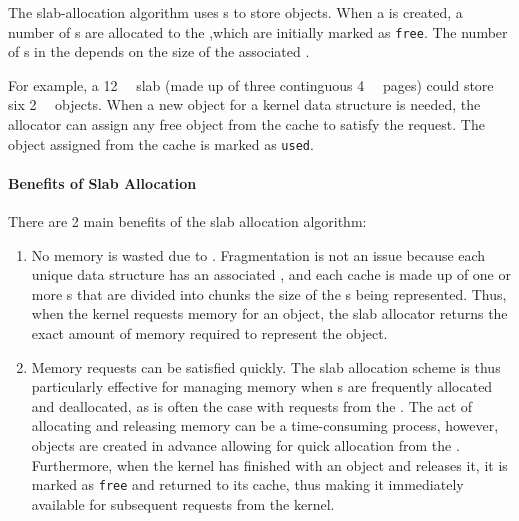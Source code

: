 The slab-allocation algorithm uses s to store  objects.
When a  is created, a number of s are allocated to the ,which are initially marked as \texttt{free}.
The number of s in the  depends on the size of the associated .

For example, a \SI{12}{\kibi{} \byte{}} slab (made up of three continguous \SI{4}{\kibi{} \byte{}} pages) could store six \SI{2}{\kibi{} \byte{}} objects.
When a new object for a kernel data structure is needed, the allocator can assign any free object from the cache to satisfy the request.
The object assigned from the cache is marked as \texttt{used}.

\paragraph{Benefits of Slab Allocation}\label{subsubsec:Slab_Allocation_Benefits}
There are 2 main benefits of the slab allocation algorithm:
\begin{enumerate}[noitemsep]
\item No memory is wasted due to .
  Fragmentation is not an issue because each unique  data structure has an associated , and each cache is made up of one or more s that are divided into chunks the size of the s being represented.
  Thus, when the kernel requests memory for an object, the slab allocator returns the exact amount of memory required to represent the object.
\item Memory requests can be satisfied quickly.
  The slab allocation scheme is thus particularly effective for managing memory when s are frequently allocated and deallocated, as is often the case with requests from the .
  The act of allocating and releasing memory can be a time-consuming process, however, objects are created in advance allowing for quick allocation from the .
  Furthermore, when the kernel has finished with an object and releases it, it is marked as \texttt{free} and returned to its cache, thus making it immediately available for subsequent requests from the kernel.
\end{enumerate}

